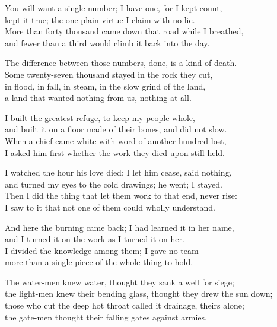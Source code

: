 \begin{founder}
You will want a single number; I have one, for I kept count,\\
kept it true; the one plain virtue I claim with no lie.\\
More than forty thousand came down that road while I breathed,\\
and fewer than a third would climb it back into the day.\\
\medskip

The difference between those numbers, done, is a kind of death.\\
Some twenty-seven thousand stayed in the rock they cut,\\
in flood, in fall, in steam, in the slow grind of the land,\\
a land that wanted nothing from us, nothing at all.\\
\medskip

I built the greatest refuge, to keep my people whole,\\
and built it on a floor made of their bones, and did not slow.\\
When a chief came white with word of another hundred lost,\\
I asked him first whether the work they died upon still held.\\
\medskip

I watched the hour his love died; I let him cease, said nothing,\\
and turned my eyes to the cold drawings; he went; I stayed.\\
Then I did the thing that let them work to that end, never rise:\\
I saw to it that not one of them could wholly understand.\\
\medskip

And here the burning came back; I had learned it in her name,\\
and I turned it on the work as I turned it on her.\\
I divided the knowledge among them; I gave no team\\
more than a single piece of the whole thing to hold.\\
\medskip

The water-men knew water, thought they sank a well for siege;\\
the light-men knew their bending glass, thought they drew the sun down;\\
those who cut the deep hot throat called it drainage, theirs alone;\\
the gate-men thought their falling gates against armies.\\
\medskip


\end{founder}
